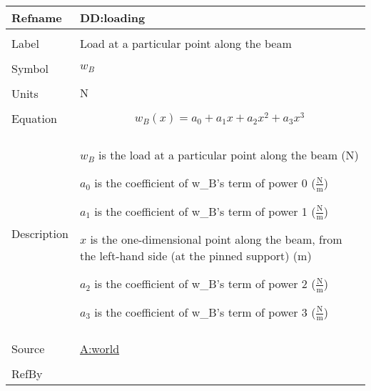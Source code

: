 \documentclass[12pt]{article}
\begin{document}
\vspace{\baselineskip}
\noindent
\begin{minipage}{\textwidth}
\begin{tabular}{>{\raggedright}p{}>{\raggedright\arraybackslash}p{}}
\toprule \textbf{Refname} & \textbf{DD:loading}
\label{DD:loading}
\\ \midrule \\
Label & Load at a particular point along the beam
        
\\ \midrule \\
Symbol & ${w_{B}}$
         
\\ \midrule \\
Units & ${\text{N}}$
        
\\ \midrule \\
Equation & \begin{displaymath}
           {w_{B}}\left(x\right)={a_{\text{0}}}+{a_{\text{1}}} x+{a_{\text{2}}} x^{2}+{a_{\text{3}}} x^{3}
           \end{displaymath}
\\ \midrule \\
Description & \begin{symbDescription}
              \item{${w_{B}}$ is the load at a particular point along the beam (${\text{N}}$)}
              \item{${a_{\text{0}}}$ is the coefficient of w\_B's term of power 0 ($\frac{\text{N}}{\text{m}}$)}
              \item{${a_{\text{1}}}$ is the coefficient of w\_B's term of power 1 ($\frac{\text{N}}{\text{m}}$)}
              \item{$x$ is the one-dimensional point along the beam, from the left-hand side (at the pinned support) (${\text{m}}$)}
              \item{${a_{\text{2}}}$ is the coefficient of w\_B's term of power 2 ($\frac{\text{N}}{\text{m}}$)}
              \item{${a_{\text{3}}}$ is the coefficient of w\_B's term of power 3 ($\frac{\text{N}}{\text{m}}$)}
              \end{symbDescription}
\\ \midrule \\
Source & \hyperref[world]{A:world}
         
\\ \midrule \\
RefBy & 
\\ \bottomrule
\end{tabular}
\end{minipage}
\end{document}
